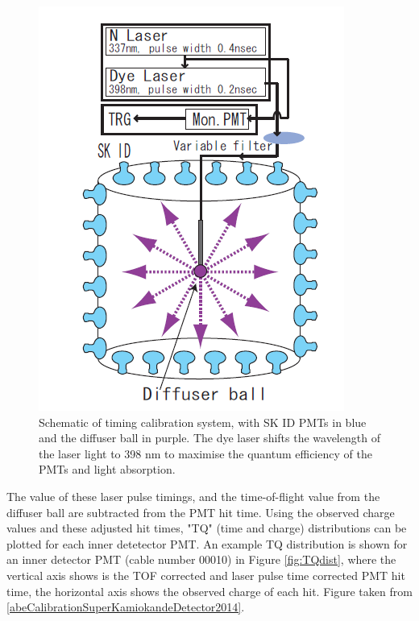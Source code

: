 \begin{figure}
    \includegraphics[width=\textwidth]{Figures/timecalibsystem.png}
\caption{Schematic of timing calibration system, with SK ID PMTs in blue and the diffuser ball in purple. The dye laser shifts the wavelength of the laser light to 398 nm to maximise the quantum efficiency of the PMTs and light absorption.}
    \label{fig:singlepe}
\end{figure}


The value of these laser pulse timings, and the time-of-flight value from the diffuser ball are subtracted from the PMT hit time. Using the observed charge values and these adjusted hit times, "TQ" (time and charge) distributions can be plotted for each inner detetector PMT. An example TQ distribution is shown for an inner detector PMT (cable number 00010) in Figure \ref{fig:TQdist}, where the vertical axis shows is the TOF corrected and laser pulse time corrected PMT hit time, the horizontal axis shows the observed charge of each hit. Figure taken from \ref{abeCalibrationSuperKamiokandeDetector2014}. 

